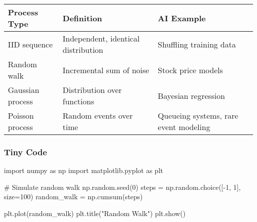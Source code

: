 \documentclass[
  letterpaper,
  DIV=11,
  numbers=noendperiod]{scrreprt}
\newenvironment{Shaded}{\begin{snugshade}}{\end{snugshade}}
\newcommand{\CommentTok}[1]{\textcolor[rgb]{0.37,0.37,0.37}{#1}}
\newcommand{\DecValTok}[1]{\textcolor[rgb]{0.68,0.00,0.00}{#1}}
\newcommand{\ImportTok}[1]{\textcolor[rgb]{0.00,0.46,0.62}{#1}}
\newcommand{\NormalTok}[1]{\textcolor[rgb]{0.00,0.23,0.31}{#1}}
\newcommand{\OperatorTok}[1]{\textcolor[rgb]{0.37,0.37,0.37}{#1}}
\newcommand{\StringTok}[1]{\textcolor[rgb]{0.13,0.47,0.30}{#1}}
\begin{document}
\begin{longtable}[]{@{}
  >{\raggedright\arraybackslash}p{}
  >{\raggedright\arraybackslash}p{}
  >{\raggedright\arraybackslash}p{}@{}}
\toprule\noalign{}
\begin{minipage}[b]{\linewidth}\raggedright
Process Type
\end{minipage} & \begin{minipage}[b]{\linewidth}\raggedright
Definition
\end{minipage} & \begin{minipage}[b]{\linewidth}\raggedright
AI Example
\end{minipage} \\
\midrule\noalign{}
\endhead
\bottomrule\noalign{}
\endlastfoot
IID sequence & Independent, identical distribution & Shuffling training
data \\
Random walk & Incremental sum of noise & Stock price models \\
Gaussian process & Distribution over functions & Bayesian regression \\
Poisson process & Random events over time & Queueing systems, rare event
modeling \\
\end{longtable}

\subsubsection{Tiny Code}\label{tiny-code-173}

\begin{Shaded}
\begin{Highlighting}[]
\ImportTok{import}\NormalTok{ numpy }\ImportTok{as}\NormalTok{ np}
\ImportTok{import}\NormalTok{ matplotlib.pyplot }\ImportTok{as}\NormalTok{ plt}

\CommentTok{\# Simulate random walk}
\NormalTok{np.random.seed(}\DecValTok{0}\NormalTok{)}
\NormalTok{steps }\OperatorTok{=}\NormalTok{ np.random.choice([}\OperatorTok{{-}}\DecValTok{1}\NormalTok{, }\DecValTok{1}\NormalTok{], size}\OperatorTok{=}\DecValTok{100}\NormalTok{)}
\NormalTok{random\_walk }\OperatorTok{=}\NormalTok{ np.cumsum(steps)}

\NormalTok{plt.plot(random\_walk)}
\NormalTok{plt.title(}\StringTok{"Random Walk"}\NormalTok{)}
\NormalTok{plt.show()}
\end{Highlighting}
\end{Shaded}
\end{document}
